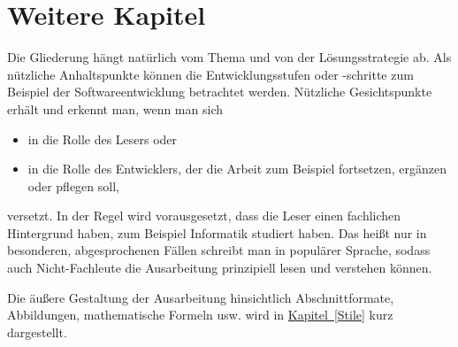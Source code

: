 \chapter{Weitere Kapitel}

Die Gliederung hängt natürlich vom Thema und von der Lösungsstrategie ab. Als nützliche
Anhaltspunkte können die Entwicklungsstufen oder -schritte zum Beispiel der Softwareentwicklung betrachtet werden. Nützliche Gesichtspunkte erhält und erkennt man, wenn man sich
\begin{itemize}
  \item in die Rolle des Lesers oder
  \item in die Rolle des Entwicklers, der die Arbeit zum Beispiel fortsetzen, ergänzen oder pflegen soll,
\end{itemize}
versetzt. In der Regel wird vorausgesetzt, dass die Leser einen fachlichen Hintergrund haben, zum Beispiel Informatik studiert haben. Das heißt nur in besonderen, abgesprochenen Fällen schreibt man in populärer Sprache, sodass auch Nicht-Fachleute die Ausarbeitung prinzipiell lesen und verstehen können.

Die äußere Gestaltung der Ausarbeitung hinsichtlich Abschnittformate, Abbildungen, mathematische Formeln usw. wird in \hyperref[Stile]{Kapitel~\ref*{Stile}} kurz dargestellt.